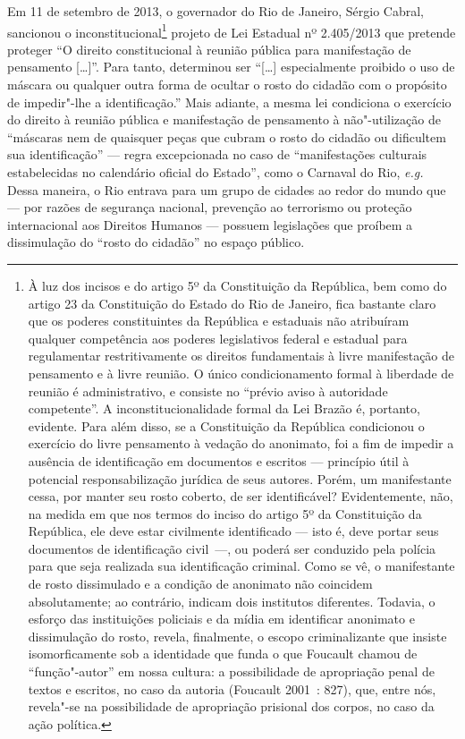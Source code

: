 Em 11 de setembro de 2013, o governador do Rio de Janeiro, Sérgio
Cabral, sancionou o inconstitucional\footnote{À luz dos
  incisos  e  do artigo 5º da Constituição da República, bem como
  do artigo 23 da Constituição do Estado do Rio de Janeiro, fica
  bastante claro que os poderes constituintes da República e estaduais
  não atribuíram qualquer competência aos poderes legislativos federal e
  estadual para regulamentar restritivamente os direitos fundamentais à
  livre manifestação de pensamento e à livre reunião. O único
  condicionamento formal à liberdade de reunião é administrativo, e
  consiste no ``prévio aviso à autoridade competente''. A
  inconstitucionalidade formal da Lei Brazão é, portanto, evidente. Para
  além disso, se a Constituição da República condicionou o exercício do
  livre pensamento à vedação do anonimato, foi a fim de impedir a
  ausência de identificação em documentos e escritos --- princípio útil à
  potencial responsabilização jurídica de seus autores. Porém, um
  manifestante cessa, por manter seu rosto coberto, de ser
  identificável? Evidentemente, não, na medida em que nos termos do
  inciso  do artigo 5º da Constituição da República, ele deve estar
  civilmente identificado --- isto é, deve portar seus documentos de
  identificação civil~---, ou poderá ser conduzido pela polícia para que
  seja realizada sua identificação criminal. Como se vê, o manifestante
  de rosto dissimulado e a condição de anonimato não coincidem
  absolutamente; ao contrário, indicam dois institutos diferentes.
  Todavia, o esforço das instituições policiais e da mídia em
  identificar anonimato e dissimulação do rosto, revela, finalmente, o
  escopo criminalizante que insiste isomorficamente sob a identidade que
  funda o que Foucault chamou de ``função"-autor'' em nossa cultura: a
  possibilidade de apropriação penal de textos e escritos, no caso da
  autoria (Foucault 2001~: 827), que, entre nós, revela"-se na
  possibilidade de apropriação prisional dos corpos, no caso da ação
  política.} projeto de Lei Estadual nº 2.405/2013 que pretende
proteger ``O direito constitucional à reunião pública para manifestação
de pensamento {[}\ldots{}{]}''. Para tanto, determinou ser ``{[}\ldots{}{]}
especialmente proibido o uso de máscara ou qualquer outra forma de
ocultar o rosto do cidadão com o propósito de impedir"-lhe a
identificação.'' Mais adiante, a mesma lei condiciona o exercício do
direito à reunião pública e manifestação de pensamento à não"-utilização
de ``máscaras nem de quaisquer peças que cubram o rosto do cidadão ou
dificultem sua identificação'' --- regra excepcionada no caso de
``manifestações culturais estabelecidas no calendário oficial do
Estado'', como o Carnaval do Rio, \emph{e.g.} Dessa maneira, o Rio
entrava para um grupo de cidades ao redor do mundo que --- por razões de
segurança nacional, prevenção ao terrorismo ou proteção internacional
aos Direitos Humanos --- possuem legislações que proíbem a dissimulação
do ``rosto do cidadão'' no espaço público.


